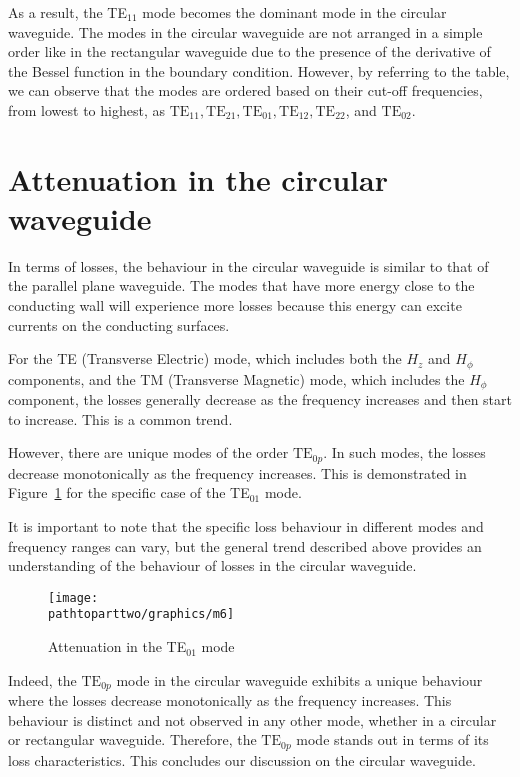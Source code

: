 As a result, the TE$_{11}$ mode becomes the dominant mode in the circular waveguide. The modes in the circular waveguide are not arranged in a simple order like in the rectangular waveguide due to the presence of the derivative of the Bessel function in the boundary condition. However, by referring to the table, we can observe that the modes are ordered based on their cut-off frequencies, from lowest to highest, as $\text{TE}_{11}, \text{TE}_{21}, \text{TE}_{01}, \text{TE}_{12}, \text{TE}_{22}$, and $\text{TE}_{02}$.

\section{Attenuation in the circular waveguide}
In terms of losses, the behaviour in the circular waveguide is similar to that of the parallel plane waveguide. The modes that have more energy close to the conducting wall will experience more losses because this energy can excite currents on the conducting surfaces. 

For the TE (Transverse Electric) mode, which includes both the $H_z$ and $H_\phi$ components, and the TM (Transverse Magnetic) mode, which includes the $H_\phi$ component, the losses generally decrease as the frequency increases and then start to increase. This is a common trend. 

However, there are unique modes of the order $\text{TE}_{0p}$. In such modes, the losses decrease monotonically as the frequency increases. This is demonstrated in Figure~\ref{fig:m6} for the specific case of the TE$_{01}$ mode.

It is important to note that the specific loss behaviour in different modes and frequency ranges can vary, but the general trend described above provides an understanding of the behaviour of losses in the circular waveguide.
\begin{figure}[h]
\centering
\texttt{[image: \\pathtoparttwo/graphics/m6]}
\caption{Attenuation in the TE$_{01}$ mode}
\label{fig:m6}
\end{figure}

Indeed, the $\text{TE}_{0p}$ mode in the circular waveguide exhibits a unique behaviour where the losses decrease monotonically as the frequency increases. This behaviour is distinct and not observed in any other mode, whether in a circular or rectangular waveguide. Therefore, the $\text{TE}_{0p}$ mode stands out in terms of its loss characteristics. This concludes our discussion on the circular waveguide.
